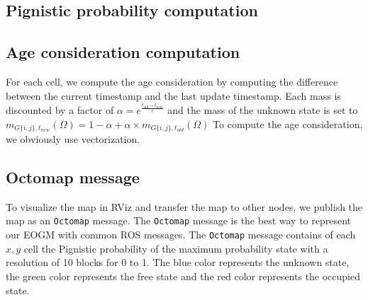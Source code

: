 \subsection{Pignistic probability computation}

\todo

\subsection{Age consideration computation}

For each cell, we compute the age consideration by computing the difference between the current timestamp and the last update timestamp.
Each mass is discounted by a factor of $\alpha = e^{\frac{t_{old}-t_{new}}{\tau}} $ and the mass of the unknown state is set to $m_{G\{i, j\}, t_{new}}(\Omega) = 1 - \alpha + \alpha \times m_{G\{i, j\}, t_{old}}(\Omega)$
To compute the age consideration, we obviously use vectorization.

\subsection{Octomap message}

To visualize the map in RViz and transfer the map to other nodes, we publish the map as an \texttt{Octomap} message.
The \texttt{Octomap} message is the best way to represent our EOGM with common ROS messages. 
The \texttt{Octomap} message contains of each $x, y$ cell the Pignistic probability of the maximum probability state with a resolution of 10 blocks for 0 to 1.
The blue color represents the unknown state, the green color represents the free state and the red color represents the occupied state.

